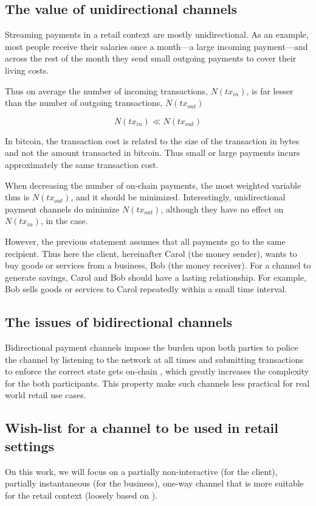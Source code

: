 \documentclass{llncs}
\begin{document}
\subsection{The value of unidirectional channels}
Streaming payments in a retail context are mostly unidirectional. As an example,
most people receive their salaries once a month---a large incoming payment---and
across the rest of the month they send small outgoing payments to cover their
living costs.

Thus on average the number of incoming transactions, $N(tx_{in})$, is far
lesser than the number of outgoing transactions, $N(tx_{out})$

$$N(tx_{in}) \ll N(tx_{out})$$

In bitcoin, the transaction cost is related to the size of the transaction in
bytes and not the amount transacted in bitcoin. Thus small or large payments
incurs approximately the same transaction cost.

When decreasing the number of on-chain payments, the most weighted variable thus
is $N(tx_{out})$, and it should be minimized. Interestingly, unidirectional
payment channels do minimize $N(tx_{out})$, although they have no effect on
$N(tx_{in})$, in the case.

However, the previous statement assumes that all payments go to the same
recipient. Thus here the client, hereinafter Carol (the money sender), wants to
buy goods or services from a business, Bob (the money receiver). For a channel
to generate savings, Carol and Bob should have a lasting relationship. For
example, Bob sells goods or services to Carol repeatedly within a small time
interval.

\subsection{The issues of bidirectional channels} Bidirectional payment channels
impose the burden upon both parties to police the channel by listening to
the network at all times and submitting transactions to enforce the correct
state gets on-chain \cite{lightningNetwork}, which greatly increases the
complexity for the both participants. This property make such channels
less practical for real world retail use cases.

\subsection{Wish-list for a channel to be used in retail settings } On this
work, we will focus on a partially non-interactive (for the client), partially
instantaneous (for the business), one-way channel that is more suitable for the
retail context (loosely based on \cite{YoursLightningProtocol,
lightningNetwork}).
\end{document}
